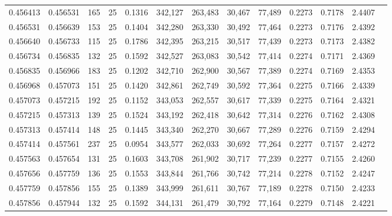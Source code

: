 \begin{tabular}{rrrrrrrrrrrrr}
0.456413 & 0.456531 &   165 &  25 &                                     0.1316 & 342,127 & 263,483 &  30,467 &  77,489 & 0.2273 & 0.7178 & 2.4407 \\
0.456531 & 0.456639 &   153 &  25 &                                     0.1404 & 342,280 & 263,330 &  30,492 &  77,464 & 0.2273 & 0.7176 & 2.4392 \\
0.456640 & 0.456733 &   115 &  25 &                                     0.1786 & 342,395 & 263,215 &  30,517 &  77,439 & 0.2273 & 0.7173 & 2.4382 \\
0.456734 & 0.456835 &   132 &  25 &                                     0.1592 & 342,527 & 263,083 &  30,542 &  77,414 & 0.2274 & 0.7171 & 2.4369 \\
0.456835 & 0.456966 &   183 &  25 &                                     0.1202 & 342,710 & 262,900 &  30,567 &  77,389 & 0.2274 & 0.7169 & 2.4353 \\
0.456968 & 0.457073 &   151 &  25 &                                     0.1420 & 342,861 & 262,749 &  30,592 &  77,364 & 0.2275 & 0.7166 & 2.4339 \\
0.457073 & 0.457215 &   192 &  25 &                                     0.1152 & 343,053 & 262,557 &  30,617 &  77,339 & 0.2275 & 0.7164 & 2.4321 \\
0.457215 & 0.457313 &   139 &  25 &                                     0.1524 & 343,192 & 262,418 &  30,642 &  77,314 & 0.2276 & 0.7162 & 2.4308 \\
0.457313 & 0.457414 &   148 &  25 &                                     0.1445 & 343,340 & 262,270 &  30,667 &  77,289 & 0.2276 & 0.7159 & 2.4294 \\
0.457414 & 0.457561 &   237 &  25 &                                     0.0954 & 343,577 & 262,033 &  30,692 &  77,264 & 0.2277 & 0.7157 & 2.4272 \\
0.457563 & 0.457654 &   131 &  25 &                                     0.1603 & 343,708 & 261,902 &  30,717 &  77,239 & 0.2277 & 0.7155 & 2.4260 \\
0.457656 & 0.457759 &   136 &  25 &                                     0.1553 & 343,844 & 261,766 &  30,742 &  77,214 & 0.2278 & 0.7152 & 2.4247 \\
0.457759 & 0.457856 &   155 &  25 &                                     0.1389 & 343,999 & 261,611 &  30,767 &  77,189 & 0.2278 & 0.7150 & 2.4233 \\
0.457856 & 0.457944 &   132 &  25 &                                     0.1592 & 344,131 & 261,479 &  30,792 &  77,164 & 0.2279 & 0.7148 & 2.4221 \\

\end{tabular}
